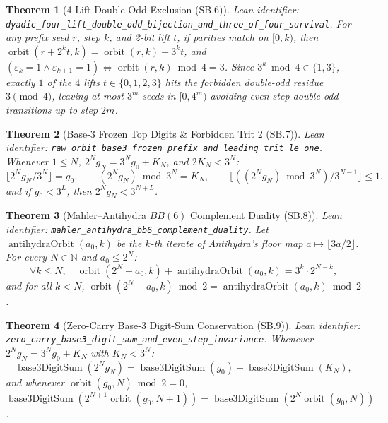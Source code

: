 \documentclass[11pt]{article}
\newtheorem{theorem}{Theorem}[section]
\begin{document}
\begin{theorem}[4-Lift Double-Odd Exclusion (SB.6)]
\emph{Lean identifier:} \nolinkurl{dyadic_four_lift_double_odd_bijection_and_three_of_four_survival}.
For any prefix seed $r$, step $k$, and 2-bit lift $t$, if parities match on $[0, k)$, then $\operatorname{orbit}(r + 2^k t, k) = \operatorname{orbit}(r, k) + 3^k t$, and $(\varepsilon_k = 1 \wedge \varepsilon_{k+1} = 1) \iff \operatorname{orbit}(r, k) \bmod 4 = 3$. Since $3^k \bmod 4 \in \{1, 3\}$, exactly $1$ of the $4$ lifts $t \in \{0, 1, 2, 3\}$ hits the forbidden double-odd residue $3 \pmod 4$, leaving at most $3^m$ seeds in $[0, 4^m)$ avoiding even-step double-odd transitions up to step $2m$.
\end{theorem}

\begin{theorem}[Base-3 Frozen Top Digits \& Forbidden Trit 2 (SB.7)]
\emph{Lean identifier:} \nolinkurl{raw_orbit_base3_frozen_prefix_and_leading_trit_le_one}.
Whenever $1 \le N$, $2^N g_N = 3^N g_0 + K_N$, and $2 K_N < 3^N$:
\[
  \lfloor 2^N g_N / 3^N \rfloor = g_0,\qquad (2^N g_N) \bmod 3^N = K_N,\qquad \lfloor ((2^N g_N) \bmod 3^N) / 3^{N-1} \rfloor \le 1,
\]
and if $g_0 < 3^L$, then $2^N g_N < 3^{N + L}$.
\end{theorem}

\begin{theorem}[Mahler--Antihydra $BB(6)$ Complement Duality (SB.8)]
\emph{Lean identifier:} \nolinkurl{mahler_antihydra_bb6_complement_duality}.
Let $\operatorname{antihydraOrbit}(a_0, k)$ be the $k$-th iterate of Antihydra's floor map $a \mapsto \lfloor 3a/2 \rfloor$. For every $N \in \mathbb{N}$ and $a_0 \le 2^N$:
\[
  \forall k \le N,\quad \operatorname{orbit}(2^N - a_0, k) + \operatorname{antihydraOrbit}(a_0, k) = 3^k \cdot 2^{N - k},
\]
and for all $k < N$, $\operatorname{orbit}(2^N - a_0, k) \bmod 2 = \operatorname{antihydraOrbit}(a_0, k) \bmod 2$.
\end{theorem}

\begin{theorem}[Zero-Carry Base-3 Digit-Sum Conservation (SB.9)]
\emph{Lean identifier:} \nolinkurl{zero_carry_base3_digit_sum_and_even_step_invariance}.
Whenever $2^N g_N = 3^N g_0 + K_N$ with $K_N < 3^N$:
\[
  \operatorname{base3DigitSum}(2^N g_N) = \operatorname{base3DigitSum}(g_0) + \operatorname{base3DigitSum}(K_N),
\]
and whenever $\operatorname{orbit}(g_0, N) \bmod 2 = 0$, $\operatorname{base3DigitSum}(2^{N+1}\operatorname{orbit}(g_0, N+1)) = \operatorname{base3DigitSum}(2^N\operatorname{orbit}(g_0, N))$.
\end{theorem}
\end{document}
